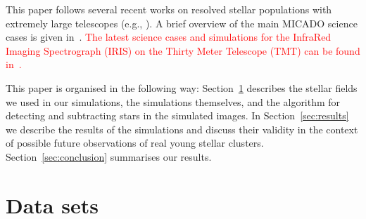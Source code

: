\documentclass{aa}
\newcommand{\langedit}[1]{\textcolor{red}{#1}}
\begin{document}
This paper follows several recent works on resolved stellar populations with extremely large telescopes
(e.g., \citealt{deep11, greggio12, gullieuszik15, tolstoy19_iau}).
A brief overview of the main MICADO science cases is given in~\cite{micado2016}.
\langedit{The latest science cases and simulations for the InfraRed Imaging Spectrograph (IRIS) on the Thirty Meter Telescope (TMT) can be found in~\cite{tmt_iris16}.}

This paper is organised in the following way: Section~\ref{sec:observations} describes the stellar fields we used in our simulations, the simulations themselves, and the algorithm for detecting and subtracting stars in the simulated images.
In Section~\ref{sec:results} we describe the results of the simulations and discuss their validity in the context of possible future observations of real young stellar clusters.
Section~\ref{sec:conclusion} summarises our results.



\section{Data sets}
\label{sec:observations}
\end{document}
